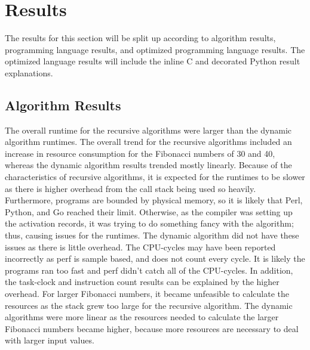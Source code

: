 \documentclass{sig-alternate}
\begin{document}
\section{Results}

The results for this section will be split up according to algorithm results, programming language results, and optimized programming language results. The optimized language results will include the inline C and decorated Python result explanations.

\subsection{Algorithm Results}

The overall runtime for the recursive algorithms were larger than the dynamic algorithm runtimes. The overall trend for the recursive algorithms included an increase in resource consumption for the Fibonacci numbers of 30 and 40, whereas the dynamic algorithm results trended mostly linearly. Because of the characteristics of recursive algorithms, it is expected for the runtimes to be slower as there is higher overhead from the call stack being used so heavily. Furthermore, programs are bounded by physical memory, so it is likely that Perl, Python, and Go reached their limit. Otherwise, as the compiler was setting up the activation records, it was trying to do something fancy with the algorithm; thus, causing issues for the runtimes. The dynamic algorithm did not have these issues as there is little overhead. The CPU-cycles may have been reported incorrectly as perf is sample based, and does not count every cycle. It is likely the programs ran too fast and perf didn’t catch all of the CPU-cycles. In addition, the task-clock and instruction count results can be explained by the higher overhead. For larger Fibonacci numbers, it became unfeasible to calculate the resources as the stack grew too large for the recursive algorithm. The dynamic algorithms were more linear as the resources needed to calculate the larger Fibonacci numbers became higher, because more resources are necessary to deal with larger input values.
\end{document}
